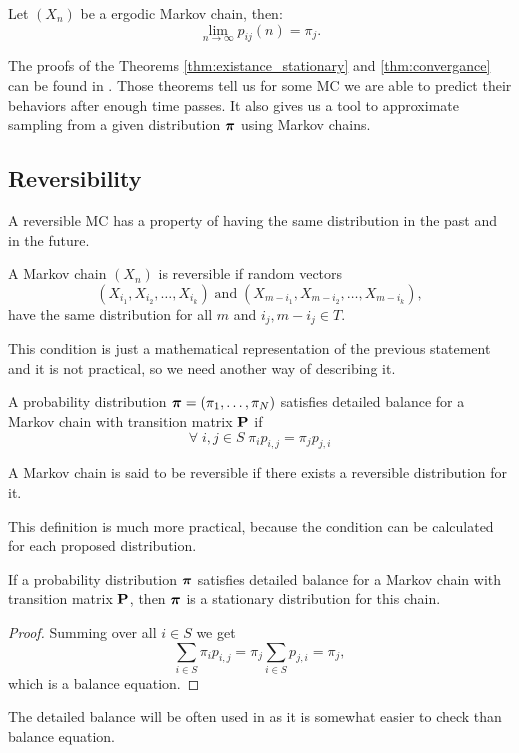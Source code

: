 	
	\begin{theorem} \label{thm:convergance}
		Let $(X_n)$ be a ergodic Markov chain, then:
		\begin{equation*}
			\lim_{n \rightarrow \infty} p_{ij}(n) = \pi_j.
		\end{equation*}
	\end{theorem}
	The proofs of the Theorems \ref{thm:existance_stationary} and \ref{thm:convergance} can be found in \cite{haggstrom2002finite}. Those theorems tell us for some MC we are able to predict their behaviors after enough time passes. It also gives us a tool to approximate sampling from a given distribution $\boldsymbol{\pi}$ using Markov chains.
	
\subsection{Reversibility}
	A reversible MC has a property of having the same distribution in the past and in the future.
	\begin{definition}[Reversibility]
		A Markov chain $(X_n)$ is reversible if random vectors
		\begin{equation*}
			(X_{i_1}, X_{i_2}, \ldots, X_{i_k}) \; \mathrm{and} \; (X_{m-i_1}, X_{m-i_2}, \ldots, X_{m-i_k}),
		\end{equation*}
		have the same distribution for all $m$ and $i_j, m-i_j \in T$.
	\end{definition}
	
	This condition is just a mathematical representation of the previous statement and it is not practical, so we need another way of describing it.
	\begin{definition}
		A probability distribution $\boldsymbol{\pi} = (\pi_1, \ldots, \pi_N)$ satisfies detailed balance for a Markov chain with transition matrix $\mathbf{P}$ if
		\begin{equation*}
			\forall \; i,j \in S \; \pi_i p_{i,j} = \pi_j p_{j,i}
		\end{equation*}
	\end{definition}
	
	\begin{definition}
		A Markov chain is said to be reversible if there exists a reversible distribution for it.
	\end{definition}

	This definition is much more practical, because the condition can be calculated for each proposed distribution.
	
	\begin{theorem}
		If a probability distribution $\boldsymbol{\pi}$ satisfies detailed balance for a Markov chain with transition matrix $\mathbf{P}$, then $\boldsymbol{\pi}$ is a stationary distribution for this chain.
	\end{theorem}
	\begin{proof}
		Summing over all $i \in S$ we get
		\begin{equation*}
			\sum_{i \in S} \pi_i p_{i,j} = \pi_j \sum_{i \in S} p_{j,i} = \pi_j,
		\end{equation*}
		which is a balance equation.
	\end{proof}

	The detailed balance will be often used in as it is somewhat easier to check than balance equation.
	
	
	